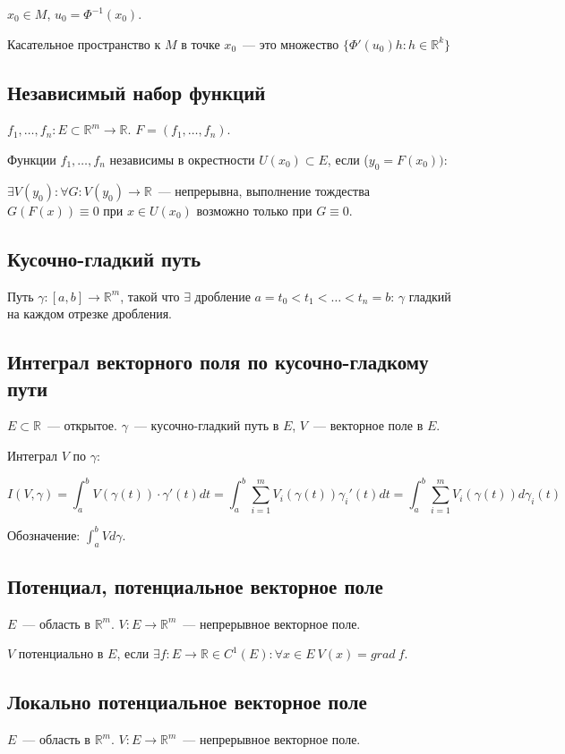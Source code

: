 \documentclass[paper=a4, fontsize=11pt]{article}
\begin{document}
$x_0 \in M$, $u_0 = \Phi^{-1}(x_0)$.

Касательное пространство к $M$ в точке $x_0$~--- это множество
$\{ \Phi'(u_0)h: h \in \mathds{R}^k \}$

\subsection{Независимый набор функций}
$f_1,\dots,f_n:E \subset \mathds{R}^m \to \mathds{R}$. $F = (f_1,\dots,f_n)$.

Функции $f_1,\dots,f_n$ независимы в окрестности $U(x_0) \subset E$, если ($y_0 = F(x_0))$:

$\exists V(y_0): \forall G: V(y_0) \rightarrow \mathds{R}$~--- непрерывна, выполнение тождества $G(F(x)) \equiv 0$ при $x \in U(x_0)$
возможно только при $G \equiv 0$.

\subsection{Кусочно-гладкий путь}
Путь $\gamma: [a,b] \rightarrow \mathds{R}^m$, такой что $\exists$ дробление $a=t_0<t_1<\dots<t_n=b$:
$\gamma$ гладкий на каждом отрезке дробления.

\subsection{Интеграл векторного поля по кусочно-гладкому пути}
$E \subset \mathds{R}$~--- открытое. $\gamma$~--- кусочно-гладкий путь в $E$, $V$~--- векторное поле в $E$.

Интеграл $V$ по $\gamma$:

$$I(V, \gamma) = \int_a^b V(\gamma(t)) \cdot \gamma'(t) dt = \int_a^b \sum_{i=1}^m V_i(\gamma(t)) \gamma_i'(t) dt =
\int_a^b \sum_{i=1}^m V_i(\gamma(t)) d\gamma_i(t) $$

Обозначение: $\int_a^b V d\gamma$.

\subsection{Потенциал, потенциальное векторное поле}
$E$~--- область в $\mathds{R}^m$. $V: E \rightarrow \mathds{R}^m$~--- непрерывное векторное поле.

$V$ потенциально в $E$, если $\exists f: E \rightarrow \mathds{R} \in C^1(E): \forall x \in E\ V(x) = grad\ f$.

\subsection{Локально потенциальное векторное поле}
$E$~--- область в $\mathds{R}^m$. $V: E \rightarrow \mathds{R}^m$~--- непрерывное векторное поле.
\end{document}
